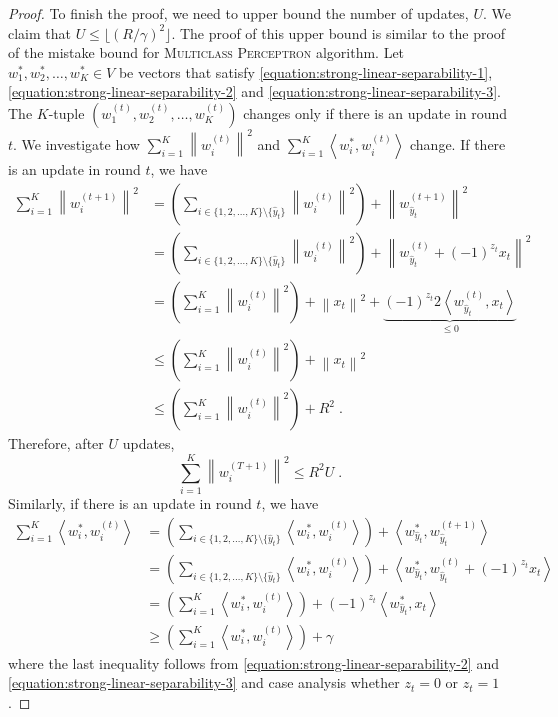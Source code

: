 \documentclass[12pt]{article}
\newcommand{\ip}[2]{\left\langle #1, #2 \right\rangle} %
\newcommand{\norm}[1]{\left\| #1 \right\|}  %
\begin{document}
\begin{proof}
To finish the proof, we need to upper bound the number of updates, $U$. We claim
that $U \le \lfloor (R/\gamma)^2 \rfloor$. The proof of this upper bound is
similar to the proof of the mistake bound for \textsc{Multiclass Perceptron}
algorithm. Let $w_1^*, w_2^*, \dots, w_K^* \in V$ be vectors that satisfy
\eqref{equation:strong-linear-separability-1},
\eqref{equation:strong-linear-separability-2} and
\eqref{equation:strong-linear-separability-3}.
The $K$-tuple $(w_1^{(t)}, w_2^{(t)}, \dots, w_K^{(t)})$
changes only if there is an update in round $t$.
We investigate how $\sum_{i=1}^K \norm{w_i^{(t)}}^2$ and
$\sum_{i=1}^K \ip{w_i^*}{w_i^{(t)}}$ change. If there is an update in round $t$,
we have
\begin{align*}
\sum_{i=1}^K \norm{w_i^{(t+1)}}^2
& = \left( \sum_{i \in \{1,2,\dots,K\} \setminus \{\widehat y_t\}} \norm{w_i^{(t)}}^2 \right) + \norm{w_{\widehat y_t}^{(t+1)}}^2 \\
& = \left( \sum_{i \in \{1,2,\dots,K\} \setminus \{\widehat y_t\}} \norm{w_i^{(t)}}^2 \right) + \norm{w_{\widehat y_t}^{(t)} + (-1)^{z_t} x_t}^2 \\
& = \left( \sum_{i=1}^K \norm{w_i^{(t)}}^2 \right) + \norm{x_t}^2 + \underbrace{(-1)^{z_t} 2 \ip{w_{\widehat y_t}^{(t)}}{x_t}}_{\le 0} \\
& \le \left( \sum_{i=1}^K \norm{w_i^{(t)}}^2 \right) + \norm{x_t}^2 \\
& \le \left( \sum_{i=1}^K \norm{w_i^{(t)}}^2 \right) + R^2 \; .
\end{align*}
Therefore, after $U$ updates,
$$
\sum_{i=1}^K \norm{w_i^{(T+1)}}^2 \le R^2 U \; .
$$
Similarly, if there is an update in round $t$, we have
\begin{align*}
\sum_{i=1}^K \ip{w_i^*}{w_i^{(t)}}
& = \left( \sum_{i \in \{1,2,\dots,K\} \setminus \{\widehat y_t\}} \ip{w_i^*}{w_i^{(t)}} \right) + \ip{w_{\widehat y_t}^*}{w_{\widehat y_t}^{(t+1)}} \\
& = \left( \sum_{i \in \{1,2,\dots,K\} \setminus \{\widehat y_t\}} \ip{w_i^*}{w_i^{(t)}} \right) + \ip{w_{\widehat y_t}^*}{w_{\widehat y_t}^{(t)} + (-1)^{z_t} x_t} \\
& = \left( \sum_{i=1}^K \ip{w_i^*}{w_i^{(t)}} \right) + (-1)^{z_t} \ip{w_{\widehat y_t}^*}{x_t} \\
& \ge \left( \sum_{i=1}^K \ip{w_i^*}{w_i^{(t)}} \right) + \gamma
\end{align*}
where the last inequality follows from \eqref{equation:strong-linear-separability-2}
and \eqref{equation:strong-linear-separability-3} and case analysis whether $z_t = 0$ or $z_t = 1$.

\end{proof}
\end{document}
